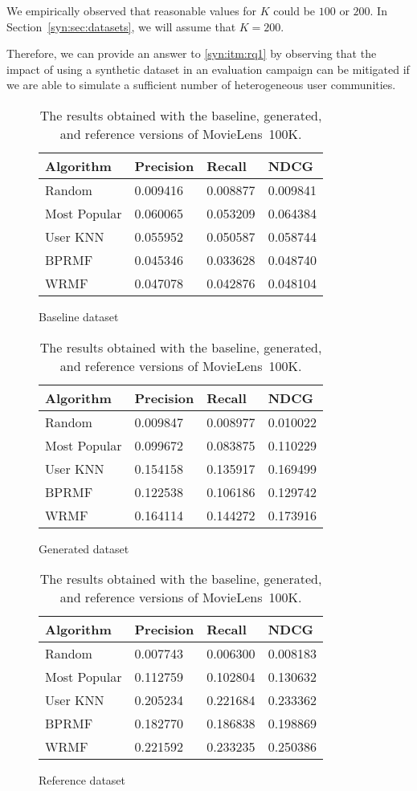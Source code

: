 We empirically observed that reasonable values for $K$ could be $100$ or $200$. In Section~\ref{syn:sec:datasets}, we will assume that $K = 200$.

Therefore, we can provide an answer to \ref{syn:itm:rq1} by observing that the impact of using a synthetic dataset in an evaluation campaign can be mitigated if we are able to simulate a sufficient number of heterogeneous user communities.

\begin{table}
\begin{subfigure}{\textwidth}
\centering
\begin{tabular}{@{}llll@{}}
\toprule
Algorithm & Precision & Recall & NDCG \\ \midrule
Random & 0.009416 & 0.008877 & 0.009841 \\
Most Popular & 0.060065 & 0.053209 & 0.064384 \\
User KNN & 0.055952 & 0.050587 & 0.058744 \\
BPRMF & 0.045346 & 0.033628 & 0.048740 \\
WRMF & 0.047078 & 0.042876 & 0.048104 \\ \bottomrule
\end{tabular}
\caption{Baseline dataset}
\bigskip
\end{subfigure}
\begin{subfigure}{\textwidth}
\centering
\begin{tabular}{@{}llll@{}}
\toprule
Algorithm & Precision & Recall & NDCG \\ \midrule
Random & 0.009847 & 0.008977 & 0.010022 \\
Most Popular & 0.099672 & 0.083875 & 0.110229 \\
User KNN & 0.154158 & 0.135917 & 0.169499 \\
BPRMF & 0.122538 & 0.106186 & 0.129742 \\
WRMF & 0.164114 & 0.144272 & 0.173916 \\ \bottomrule
\end{tabular}
\caption{Generated dataset}
\bigskip
\end{subfigure}
\begin{subfigure}{\textwidth}
\centering
\begin{tabular}{@{}llll@{}}
\toprule
Algorithm & Precision & Recall & NDCG \\ \midrule
Random & 0.007743 & 0.006300 & 0.008183 \\
Most Popular & 0.112759 & 0.102804 & 0.130632 \\
User KNN & 0.205234 & 0.221684 & 0.233362 \\
BPRMF & 0.182770 & 0.186838 & 0.198869 \\
WRMF & 0.221592 & 0.233235 & 0.250386 \\ \bottomrule
\end{tabular}
\caption{Reference dataset}
\end{subfigure}
\caption[Experimental results with the synthetic MovieLens~100K]{The results obtained with the baseline, generated, and reference versions of MovieLens~100K.}
\label{syn:tab:movielens-100k}
\end{table}

